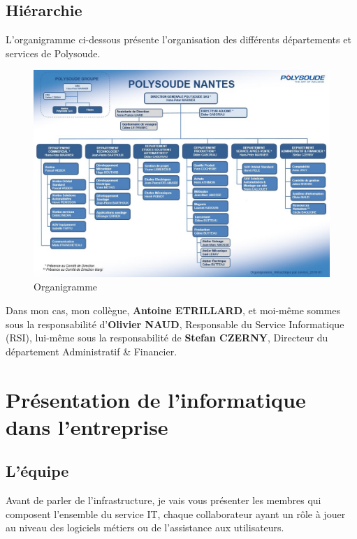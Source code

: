 \documentclass[11pt,a4paper,oneside]{article}
\begin{document}
\subsection{Hiérarchie}
L’organigramme ci-dessous présente l’organisation des différents départements et services de Polysoude.
\begin{figure}[h!]
  \centering
  \includegraphics[width=\linewidth]{Ressources/Organigramme.jpg}
  \caption{Organigramme}
\end{figure}

Dans mon cas, mon collègue, \textbf{Antoine ETRILLARD}, et moi-même sommes sous la responsabilité d'\textbf{Olivier NAUD}, Responsable du Service Informatique (RSI), lui-même sous la responsabilité de  \textbf{Stefan CZERNY}, Directeur du département Administratif \& Financier.
\newpage

\section{Présentation de l'informatique dans l'entreprise}
\subsection{L'équipe}
Avant de parler de l’infrastructure, je vais vous présenter les membres qui composent l’ensemble du service IT, chaque collaborateur ayant un rôle à jouer au niveau des logiciels métiers ou de l’assistance aux utilisateurs.
\end{document}
